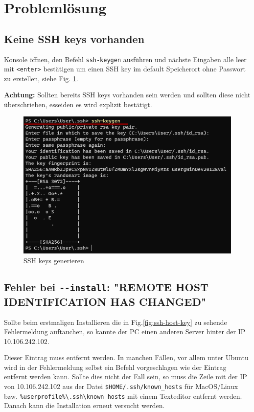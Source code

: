 \documentclass[11pt, a4paper]{article}
\begin{document}
\clearpage
\section{Problemlösung}

\subsection{Keine SSH keys vorhanden}\label{sec:ssh}
Konsole öffnen, den Befehl \texttt{ssh-keygen} ausführen und nächste Eingaben alle leer mit \texttt{<enter>} bestätigen um einen SSH key im default Speicherort ohne Passwort zu erstellen, siehe Fig. \ref{fig:ssh}.

\textbf{Achtung:} Sollten bereits SSH keys vorhanden sein werden und sollten diese nicht überschrieben, esseiden es wird explizit bestätigt.

\begin{figure}[h]
    \centering
    \includegraphics[width=0.7\linewidth]{./pics/2022-03-09_00-17.png}
    \caption{SSH keys generieren}
    \label{fig:ssh}
\end{figure}


\subsection{Fehler bei \texttt{-{}-install}: "REMOTE HOST IDENTIFICATION HAS CHANGED"}\label{sec:ssh}
Sollte beim erstmaligen Installieren die in Fig.\ref{fig:ssh-host-key} zu sehende Fehlermeldung auftauchen, so kannte der PC einen anderen Server hinter der IP 10.106.242.102.

Dieser Eintrag muss entfernt werden. In manchen Fällen, vor allem unter Ubuntu wird in der Fehlermeldung selbst ein Befehl vorgeschlagen wie der Eintrag entfernt werden kann.
Sollte dies nicht der Fall sein, so muss die Zeile mit der IP von 10.106.242.102 aus der Datei \texttt{\$HOME/.ssh/known\_hosts} für MacOS/Linux bzw. \texttt{\%userprofile\%\textbackslash.ssh\textbackslash{}known\_hosts} mit einem Texteditor entfernt werden.
Danach kann die Installation erneut versucht werden.
\end{document}
